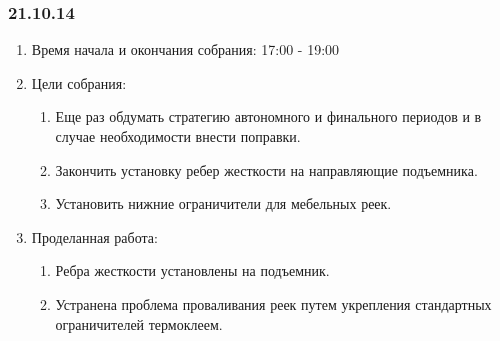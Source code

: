 	
\subsubsection{21.10.14}

\begin{enumerate}
	\item Время начала и окончания собрания:
	17:00 - 19:00
	\item Цели собрания:
	\begin{enumerate}
	  \item Еще раз обдумать стратегию автономного и финального периодов и в случае необходимости внести поправки.
	  
	  \item Закончить установку ребер жесткости на направляющие подъемника.
	  
	  \item Установить нижние ограничители для мебельных реек.
	  
    \end{enumerate}
    
	\item Проделанная работа:
	\begin{enumerate}
	  \item Ребра жесткости установлены на подъемник.
      
      \item Устранена проблема проваливания реек путем укрепления стандартных ограничителей термоклеем.
      

\end{enumerate}
\end{enumerate}
